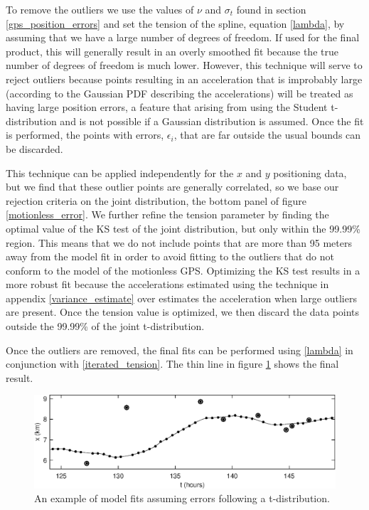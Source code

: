 \documentclass[10pt,journal]{IEEEtran}
\begin{document}
To remove the outliers we use the values of $\nu$ and $\sigma_t$ found in section \ref{gps_position_errors} and set the tension of the spline, equation \ref{lambda}, by assuming that we have a large number of degrees of freedom. If used for the final product, this will generally result in an overly smoothed fit because the true number of degrees of freedom is much lower. However, this technique will serve to reject outliers because points resulting in an acceleration that is improbably large (according to the Gaussian PDF describing the accelerations) will be treated as having large position errors, a feature that arising from using the Student t-distribution and is not possible if a Gaussian distribution is assumed. Once the fit is performed, the points with errors, $\epsilon_i$, that are far outside the usual bounds can be discarded. 

This technique can be applied independently for the $x$ and $y$ positioning data, but we find that these outlier points are generally correlated, so we base our rejection criteria on the joint distribution, the bottom panel of figure \ref{motionless_error}. We further refine the tension parameter by finding the optimal value of the KS test of the joint distribution, but only within the 99.99\% region. This means that we do not include points that are more than 95 meters away from the model fit in order to avoid fitting to the outliers that do not conform to the model of the motionless GPS. Optimizing the KS test results in a more robust fit because the accelerations estimated using the technique in appendix \ref{variance_estimate} over estimates the acceleration when large outliers are present. Once the tension value is optimized, we then discard the data points outside the 99.99\% of the joint t-distribution.

Once the outliers are removed, the final fits can be performed using \ref{lambda} in conjunction with \ref{iterated_tension}. The thin line in figure \ref{tdistributionfit} shows the final result.

\begin{figure}[t]
  \centerline{\includegraphics[width=39pc,angle=0]{tdistributionfit}}
  
  \caption{An example of model fits assuming errors following a t-distribution.}
  \label{tdistributionfit}
\end{figure}
\end{document}
